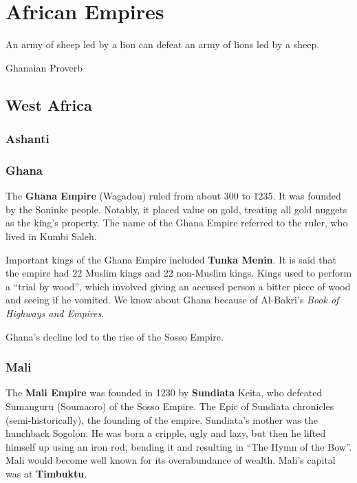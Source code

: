 \chapter{African Empires}

\epigraph{%
  An army of sheep led by a lion can defeat an army of lions led by a sheep.
}{Ghanaian Proverb}

\section{West Africa}

\subsection*{Ashanti}

\subsection*{Ghana}

The \textbf{Ghana Empire} (Wagadou) ruled from about 300 to 1235.
It was founded by the Soninke people.
Notably, it placed value on gold, treating all gold nuggets as the king's property.
The name of the Ghana Empire referred to the ruler, who lived in Kumbi Saleh.

Important kings of the Ghana Empire included \textbf{Tunka Menin}.
It is said that the empire had 22 Muslim kings and 22 non-Muslim kings.
Kings used to perform a ``trial by wood'',
which involved giving an accused person a bitter piece of wood and seeing if he vomited.
We know about Ghana because of Al-Bakri's \textit{Book of Highways and Empires}.

Ghana's decline led to the rise of the Sosso Empire.

\subsection*{Mali}

The \textbf{Mali Empire} was founded in 1230 by \textbf{Sundiata} Keita,
who defeated Sumanguru (Soumaoro) of the Sosso Empire.
The Epic of Sundiata chronicles (semi-historically), the founding of the empire.
Sundiata's mother was the hunchback Sogolon.
He was born a cripple, ugly and lazy,
but then he lifted himself up using an iron rod, bending it and resulting in ``The Hymn of the Bow''.
Mali would become well known for its overabundance of wealth.
Mali's capital was at \textbf{Timbuktu}.

